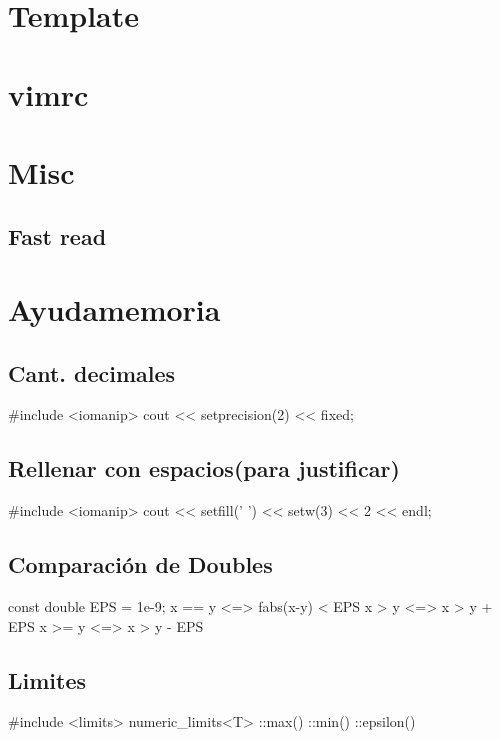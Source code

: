 {\section{Template}%

\section{vimrc}

\section{Misc}

\subsection{Fast read}

\section{Ayudamemoria}%
\subsection*{Cant. decimales} 	
\begin{code}
#include <iomanip>
cout << setprecision(2) << fixed;
\end{code}
\subsection*{Rellenar con espacios(para justificar)}
\begin{code}
#include <iomanip>
cout << setfill(' ') << setw(3) << 2 << endl;
\end{code}
\subsection*{Comparación de Doubles}
\begin{code}
const double EPS = 1e-9;
x == y	<=> fabs(x-y) < EPS
x >  y	<=> x > y + EPS
x >= y	<=> x > y - EPS
\end{code}
\subsection*{Limites}
\begin{code}
#include <limits>
numeric_limits<T>
	::max()
	::min()
	::epsilon()
\end{code}
}
